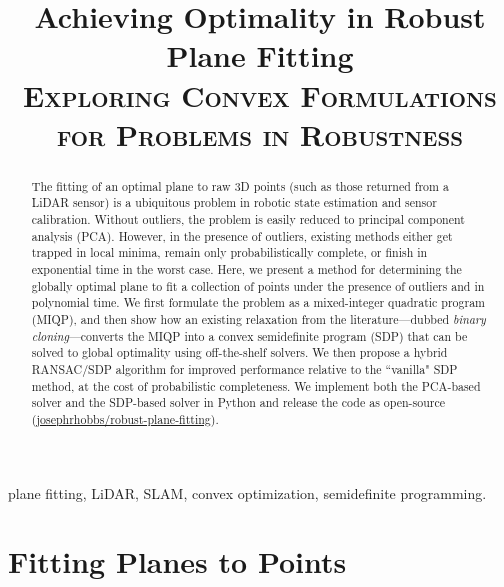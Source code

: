 \documentclass[conference]{IEEEtran}
\begin{document}
\title{Achieving Optimality in Robust Plane Fitting
\\ {\Large \textsc{Exploring Convex Formulations for Problems in Robustness}}
}

\author{


}

\maketitle

\begin{abstract}
The fitting of an optimal plane to raw 3D points (such as those returned from a LiDAR sensor) is a ubiquitous problem in robotic state estimation and sensor calibration.  Without outliers, the problem is easily reduced to principal component analysis (PCA).  However, in the presence of outliers, existing methods either get trapped in local minima, remain only probabilistically complete, or finish in exponential time in the worst case.  Here, we present a method for determining the globally optimal plane to fit a collection of points under the presence of outliers and in polynomial time.  We first formulate the problem as a mixed-integer quadratic program (MIQP), and then show how an existing relaxation from the literature---dubbed \textit{binary cloning}---converts the MIQP into a convex semidefinite program (SDP) that can be solved to global optimality using off-the-shelf solvers.  We then propose a hybrid RANSAC/SDP algorithm for improved performance relative to the ``vanilla" SDP method, at the cost of probabilistic completeness.  We implement both the PCA-based solver and the SDP-based solver in Python and release the code as open-source (\href{https://github.com/josephrhobbs/robust-plane-fitting.git}{josephrhobbs/robust-plane-fitting}).
\end{abstract}

\begin{IEEEkeywords}
plane fitting, LiDAR, SLAM, convex optimization, semidefinite programming.
\end{IEEEkeywords}

\section{Fitting Planes to Points}
\end{document}
